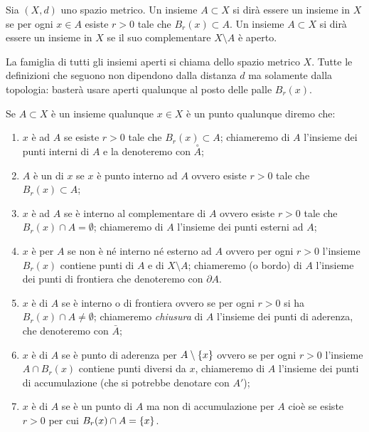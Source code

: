 \begin{definition}
\mymark{*}
\label{def:466342}
Sia $(X,d)$ uno spazio metrico.
Un insieme $A\subset X$ si dirà essere un insieme
 in $X$ se per ogni $x\in A$ esiste $r>0$
tale che $B_r(x) \subset A$.
Un insieme $A\subset X$ si dirà essere un insieme  in $X$ se il suo complementare $X\setminus A$ è aperto.

La famiglia di tutti gli insiemi aperti si chiama  dello spazio metrico $X$. Tutte le definizioni che seguono non dipendono dalla distanza $d$ ma solamente dalla topologia: basterà usare aperti qualunque al posto delle palle $B_r(x)$.

Se $A\subset X$ è un insieme qualunque
$x\in X$ è un punto qualunque diremo che:
\begin{enumerate}
\item
$x$ è  ad $A$ se esiste $r>0$ tale che $B_r(x) \subset A$;
chiameremo
di $A$ l'insieme dei punti interni di $A$
e la denoteremo con $\stackrel\circ A$;
\item
$A$ è un  di $x$ se $x$ è punto interno ad $A$
ovvero esiste $r>0$ tale che $B_r(x)\subset A$;
\item
$x$ è  ad $A$ se è interno al complementare di $A$ ovvero esiste $r>0$ tale che $B_r(x) \cap A = \emptyset$;
chiameremo  di $A$ l'insieme dei punti esterni ad $A$;
\item
$x$ è  per $A$ se non è né interno né esterno ad $A$ ovvero per ogni $r>0$ l'insieme $B_r(x)$ contiene punti di $A$ e di $X\setminus A$;
chiameremo  (o bordo) di $A$ l'insieme dei punti di frontiera che denoteremo con $\partial A$.
\item
$x$ è  di $A$ se è interno o di frontiera ovvero se per ogni $r>0$ si ha $B_r(x) \cap A \neq \emptyset$;
chiameremo \emph{chiusura} di $A$ l'insieme dei punti di aderenza,
che denoteremo con $\bar A$;
\item
$x$ è  di $A$ se
è punto di aderenza per $A \setminus {\left\{ x \right\}}$ ovvero se
per ogni $r>0$ l'insieme $A \cap B_r(x)$ contiene punti diversi da $x$, chiameremo  di $A$ l'insieme dei punti di accumulazione (che si potrebbe denotare con $A'$);
\item
$x$ è  di $A$ se è un punto di $A$ ma non di accumulazione per $A$ cioè se esiste $r>0$ per cui
$B_r(x) \cap A = {\left\{ x \right\}}$.
\end{enumerate}
\end{definition}

